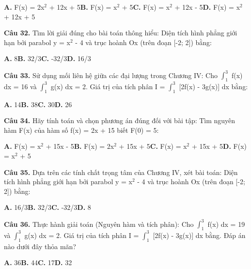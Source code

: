 \documentclass[11pt,a4paper]{article}
\begin{document}
\hspace*{1.5em}\textbf{A.} F(x) = 2x$^2$ + 12x + 5\quad\quad \textbf{B.} F(x) = x$^2$ + 5\quad\quad \textbf{C.} F(x) = x$^2$ + 12x - 5\quad\quad \textbf{D.} F(x) = x$^2$ + 12x + 5\par\vspace{2pt}
\textbf{\color{primary} Câu 32.} Tìm lời giải đúng cho bài toán thông hiểu: Diện tích hình phẳng giới hạn bởi parabol y = x$^2$ - 4 và trục hoành Ox (trên đoạn [-2; 2]) bằng:\par
\hspace*{1.5em}\textbf{A.} 8\quad\quad \textbf{B.} 32/3\quad\quad \textbf{C.} -32/3\quad\quad \textbf{D.} 16/3\par\vspace{2pt}
\textbf{\color{primary} Câu 33.} Sử dụng mối liên hệ giữa các đại lượng trong Chương IV: Cho $\int_{1}^{3}$ f(x) dx = 16 và $\int_{1}^{3}$ g(x) dx = 2. Giá trị của tích phân I = $\int_{1}^{3}$ [2f(x) - 3g(x)] dx bằng:\par
\hspace*{1.5em}\textbf{A.} 14\quad\quad \textbf{B.} 38\quad\quad \textbf{C.} 30\quad\quad \textbf{D.} 26\par\vspace{2pt}
\textbf{\color{primary} Câu 34.} Hãy tính toán và chọn phương án đúng đối với bài tập: Tìm nguyên hàm F(x) của hàm số f(x) = 2x + 15 biết F(0) = 5:\par
\hspace*{1.5em}\textbf{A.} F(x) = x$^2$ + 15x - 5\quad\quad \textbf{B.} F(x) = 2x$^2$ + 15x + 5\quad\quad \textbf{C.} F(x) = x$^2$ + 15x + 5\quad\quad \textbf{D.} F(x) = x$^2$ + 5\par\vspace{2pt}
\textbf{\color{primary} Câu 35.} Dựa trên các tính chất trọng tâm của Chương IV, xét bài toán: Diện tích hình phẳng giới hạn bởi parabol y = x$^2$ - 4 và trục hoành Ox (trên đoạn [-2; 2]) bằng:\par
\hspace*{1.5em}\textbf{A.} 16/3\quad\quad \textbf{B.} 32/3\quad\quad \textbf{C.} -32/3\quad\quad \textbf{D.} 8\par\vspace{2pt}
\textbf{\color{primary} Câu 36.} Thực hành giải toán (Nguyên hàm và tích phân): Cho $\int_{1}^{3}$ f(x) dx = 19 và $\int_{1}^{3}$ g(x) dx = 2. Giá trị của tích phân I = $\int_{1}^{3}$ [2f(x) - 3g(x)] dx bằng. Đáp án nào dưới đây thỏa mãn?\par
\hspace*{1.5em}\textbf{A.} 36\quad\quad \textbf{B.} 44\quad\quad \textbf{C.} 17\quad\quad \textbf{D.} 32\par\vspace{2pt}
\end{document}
